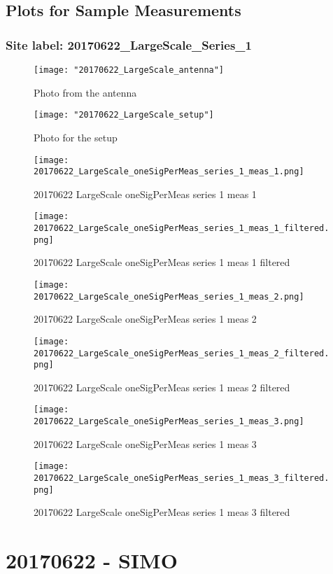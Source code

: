 \subsection{Plots for Sample Measurements}
\subsubsection{Site label: 20170622\_LargeScale\_Series\_1}
\begin{figure}[ht] \caption{Photo from the antenna}
\texttt{[image: "20170622\_LargeScale\_antenna"]}\centering\end{figure}
\begin{figure}[ht] \caption{Photo for the setup}
\texttt{[image: "20170622\_LargeScale\_setup"]}\centering\end{figure}
\begin{figure}[ht] \caption{20170622 LargeScale oneSigPerMeas series 1 meas 1}
\texttt{[image: 20170622\_LargeScale\_oneSigPerMeas\_series\_1\_meas\_1.png]}\centering\end{figure}
\begin{figure}[ht] \caption{20170622 LargeScale oneSigPerMeas series 1 meas 1 filtered}
\texttt{[image: 20170622\_LargeScale\_oneSigPerMeas\_series\_1\_meas\_1\_filtered.png]}\centering\end{figure}
\begin{figure}[ht] \caption{20170622 LargeScale oneSigPerMeas series 1 meas 2}
\texttt{[image: 20170622\_LargeScale\_oneSigPerMeas\_series\_1\_meas\_2.png]}\centering\end{figure}
\begin{figure}[ht] \caption{20170622 LargeScale oneSigPerMeas series 1 meas 2 filtered}
\texttt{[image: 20170622\_LargeScale\_oneSigPerMeas\_series\_1\_meas\_2\_filtered.png]}\centering\end{figure}
\begin{figure}[ht] \caption{20170622 LargeScale oneSigPerMeas series 1 meas 3}
\texttt{[image: 20170622\_LargeScale\_oneSigPerMeas\_series\_1\_meas\_3.png]}\centering\end{figure}
\begin{figure}[ht] \caption{20170622 LargeScale oneSigPerMeas series 1 meas 3 filtered}
\texttt{[image: 20170622\_LargeScale\_oneSigPerMeas\_series\_1\_meas\_3\_filtered.png]}\centering\end{figure}
\clearpage
\section{20170622 - SIMO}
